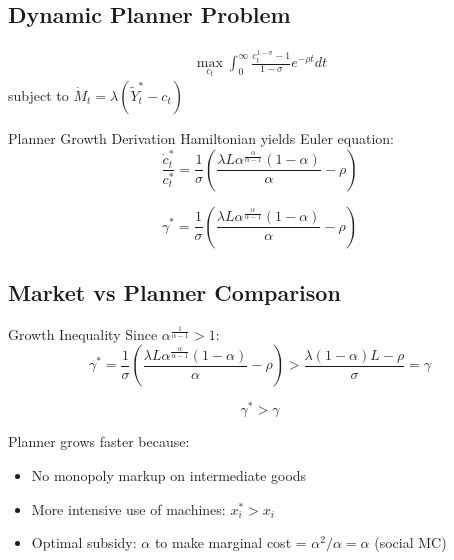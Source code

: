 \documentclass[a4paper,11pt]{article}
\begin{document}
\subsection*{Dynamic Planner Problem}
\begin{align*}
\max_{c_t} \int_0^\infty \frac{c_t^{1-\sigma}-1}{1-\sigma} e^{-\rho t} dt
\end{align*}
subject to $\dot{M}_t = \lambda(\tilde{Y}_t^* - c_t)$

\medskip
\begin{derivationbox}{Planner Growth Derivation}
Hamiltonian yields Euler equation:
\[
\frac{\dot{c}_t^*}{c_t^*} = \frac{1}{\sigma}\left(\frac{\lambda L \alpha^{\frac{\alpha}{\alpha-1}}(1-\alpha)}{\alpha} - \rho\right)
\]
\end{derivationbox}

\begin{resultbox}
\[
\boxed{\gamma^* = \frac{1}{\sigma}\left(\frac{\lambda L \alpha^{\frac{\alpha}{\alpha-1}}(1-\alpha)}{\alpha} - \rho\right)}
\tag{Planner Growth}
\]
\end{resultbox}

\subsection*{Market vs Planner Comparison}
\begin{derivationbox}{Growth Inequality}
Since $\alpha^{\frac{1}{\alpha-1}} > 1$:
\[
\gamma^* = \frac{1}{\sigma}\left(\frac{\lambda L \alpha^{\frac{\alpha}{\alpha-1}}(1-\alpha)}{\alpha} - \rho\right) > \frac{\lambda(1-\alpha)L - \rho}{\sigma} = \gamma
\]
\end{derivationbox}

\begin{resultbox}
\[
\boxed{\gamma^* > \gamma}
\tag{Planner Superiority}
\]
\end{resultbox}

\medskip
\begin{tcolorbox}[colback=blue!5,colframe=blue3,title=Policy Implication]
Planner grows faster because:
\begin{itemize}
    \item No monopoly markup on intermediate goods
    \item More intensive use of machines: $x_i^* > x_i$
    \item Optimal subsidy: $\alpha$ to make marginal cost = $\alpha^2/\alpha = \alpha$ (social MC)
\end{itemize}
\end{tcolorbox}
\end{document}
